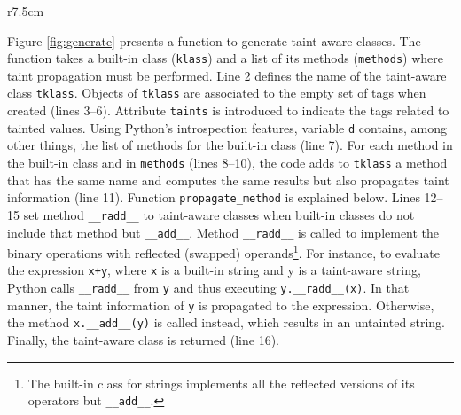 \documentclass[oribibl]{llncs}
\newcommand{\nametklass}{taint-aware }
\begin{document}
\begin{wrapfigure}{r}{7.5cm}
\vspace{-30pt}
{\small{

\caption{\label{fig:propagate} Propagation of taint information}
}}
\vspace{-15pt}
\end{wrapfigure}
Figure \ref{fig:generate} presents a function to generate
\nametklass classes. The function takes a built-in
class (\texttt{klass}) and a list of its methods
(\texttt{methods}) where taint propagation 
must be performed. 
Line 2 defines the name of the \nametklass class \texttt{tklass}.
Objects of \texttt{tklass}  
are associated to the empty set
 of tags when created (lines 3--6). Attribute 
\texttt{taints} is introduced to 
indicate the tags related to tainted values.
Using Python's introspection features, variable 
\texttt{d} contains, among other
things, the list of methods for the built-in class (line 7). 
For each method in the built-in class and in \texttt{methods} 
(lines 8--10), the code adds to \texttt{tklass} a 
method that has the same name and computes the same results 
but also propagates taint information  
(line 11).
Function \texttt{propagate\_method} is explained below.
Lines 12--15 set method \texttt{\_\_radd\_\_} to taint-aware 
classes when built-in classes do not include that method but 
\texttt{\_\_add\_\_}.
Method \texttt{\_\_radd\_\_} is called to implement the binary operations 
with reflected (swapped) operands\footnote{The built-in class 
   for strings implements all 
   the reflected versions of its operators but \texttt{\_\_add\_\_}.}. 
For instance, to evaluate the expression \texttt{x+y}, where \texttt{x} is a built-in string 
and y is a taint-aware string, Python calls \texttt{\_\_radd\_\_} from 
\texttt{y} and thus executing \texttt{y.\_\_radd\_\_(x)}. In that manner, 
the taint information of \texttt{y} is propagated to the expression. Otherwise, the method
\texttt{x.\_\_add\_\_(y)} is called instead, 
which results in an untainted string.
Finally, the \nametklass class is returned (line 16). 
\end{document}
